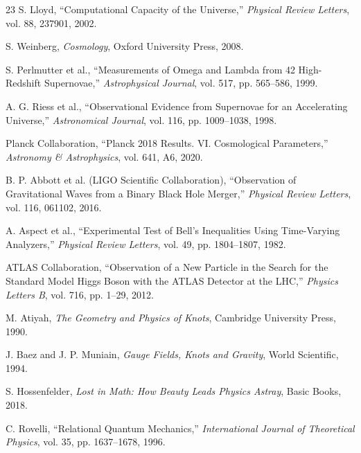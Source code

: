 \documentclass{article}
\begin{document}
\begin{thebibliography}{23}
 S. Lloyd, ``Computational Capacity of the Universe,'' \emph{Physical Review Letters}, vol. 88, 237901, 2002.

 S. Weinberg, \emph{Cosmology}, Oxford University Press, 2008.

 S. Perlmutter et al., ``Measurements of Omega and Lambda from 42 High-Redshift Supernovae,'' \emph{Astrophysical Journal}, vol. 517, pp. 565--586, 1999.

 A. G. Riess et al., ``Observational Evidence from Supernovae for an Accelerating Universe,'' \emph{Astronomical Journal}, vol. 116, pp. 1009--1038, 1998.

 Planck Collaboration, ``Planck 2018 Results. VI. Cosmological Parameters,'' \emph{Astronomy \& Astrophysics}, vol. 641, A6, 2020.

 B. P. Abbott et al. (LIGO Scientific Collaboration), ``Observation of Gravitational Waves from a Binary Black Hole Merger,'' \emph{Physical Review Letters}, vol. 116, 061102, 2016.

 A. Aspect et al., ``Experimental Test of Bell's Inequalities Using Time-Varying Analyzers,'' \emph{Physical Review Letters}, vol. 49, pp. 1804--1807, 1982.

 ATLAS Collaboration, ``Observation of a New Particle in the Search for the Standard Model Higgs Boson with the ATLAS Detector at the LHC,'' \emph{Physics Letters B}, vol. 716, pp. 1--29, 2012.

 M. Atiyah, \emph{The Geometry and Physics of Knots}, Cambridge University Press, 1990.

 J. Baez and J. P. Muniain, \emph{Gauge Fields, Knots and Gravity}, World Scientific, 1994.

 S. Hossenfelder, \emph{Lost in Math: How Beauty Leads Physics Astray}, Basic Books, 2018.

 C. Rovelli, ``Relational Quantum Mechanics,'' \emph{International Journal of Theoretical Physics}, vol. 35, pp. 1637--1678, 1996.

\end{thebibliography}
\end{document}
